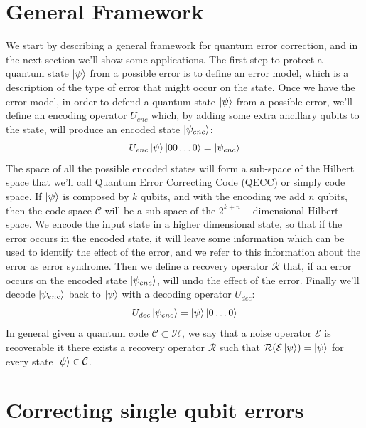 \documentclass{article}
\begin{document}
	\section{General Framework}
	We start by describing a general framework for quantum error correction, and in the next section we'll show some applications. The first step to protect a quantum state $\ket{\psi}$ from a possible error is to define an error model, which is a description of the type of error that might occur on the state. Once we have the error model, in order to defend a quantum state $\ket{\psi}$ from a possible error, we'll define an encoding operator $U_{enc}$ which, by adding some extra ancillary qubits to the state, will produce an encoded state $\ket{\psi_{enc}}$:
	\[ U_{enc}\ket{\psi}\ket{00\dots0} = \ket{\psi_{enc}} \]
	The space of all the possible encoded states will form a sub-space of the Hilbert space that we'll call Quantum Error Correcting Code (QECC) or simply code space. If $\ket{\psi}$ is composed by $k$ qubits, and with the encoding we add $n$ qubits, then the code space $\mathcal{C}$ will be a sub-space of the $2^{k+n}-$dimensional Hilbert space. We encode the input state in a higher dimensional state, so that if the error occurs in the encoded state, it will leave some information which can be used to identify the effect of the error, and we refer to this information about the error as error syndrome. Then we define a recovery operator $\mathcal{R}$ that, if an error occurs on the encoded state $\ket{\psi_{enc}}$, will undo the effect of the error. Finally we'll decode $\ket{\psi_{enc}}$ back to $\ket{\psi}$ with a decoding operator $U_{dec}$:
	\[U_{dec}\ket{\psi_{enc}} = \ket{\psi}\ket{0\dots0}\]
	In general given a quantum code $\mathcal{C} \subset \mathcal{H}$, we say that a noise operator $\mathcal{E}$ is recoverable it there exists a recovery operator $\mathcal{R}$ such that $\mathcal{R(\mathcal{E}\ket{\psi})} = \ket{\psi}$ for every state $\ket{\psi} \in \mathcal{C}$.
	\section{Correcting single qubit errors}
\end{document}
